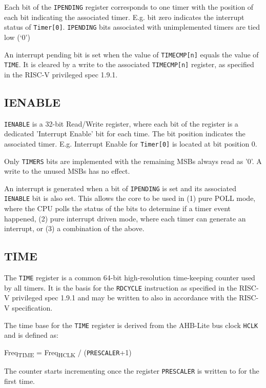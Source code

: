 Each bit of the \texttt{IPENDING} register corresponds to one timer with the
position of each bit indicating the associated timer. E.g. bit zero
indicates the interrupt status of \texttt{Timer[0]}. \texttt{IPENDING} bits associated
with unimplemented timers are tied low (`0')

An interrupt pending bit is set when the value of \texttt{TIMECMP[n]} equals
the value of \texttt{TIME}. It is cleared by a write to the associated
\texttt{TIMECMP[n]} register, as specified in the RISC-V privileged spec
1.9.1.

\subsection{IENABLE}\label{ienable}

\texttt{IENABLE} is a 32-bit Read/Write register, where each bit of the register
is a dedicated 'Interrupt Enable' bit for each time. The bit position
indicates the associated timer. E.g. Interrupt Enable for \texttt{Timer[0]}
is located at bit position 0.

Only \texttt{TIMERS} bits are implemented with the remaining MSBs always read as
'0'. A write to the unused MSBs has no effect.

An interrupt is generated when a bit of \texttt{IPENDING} is set and its
associated \texttt{IENABLE} bit is also set. This allows the core to be used in
(1) pure POLL mode, where the CPU polls the status of the bits to
determine if a timer event happened, (2) pure interrupt driven mode,
where each timer can generate an interrupt, or (3) a combination of the
above.

\subsection{TIME}\label{time}

The \texttt{TIME} register is a common 64-bit high-resolution time-keeping
counter used by all timers. It is the basis for the \texttt{RDCYCLE} instruction
as specified in the RISC-V privileged spec 1.9.1 and may be written to
also in accordance with the RISC-V specification.

The time base for the \texttt{TIME} register is derived from the AHB-Lite bus
clock \texttt{HCLK} and is defined as:

Freq\textsubscript{TIME} = Freq\textsubscript{HCLK} / (\texttt{PRESCALER}+1)

The counter starts incrementing once the register \texttt{PRESCALER} is written
to for the first time.

